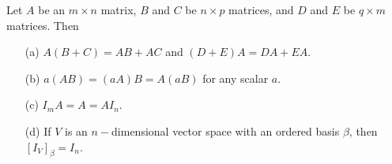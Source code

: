 \begin{theorem}\label{prop of matrices}
    Let \( A  \) be an \( m \times n  \) matrix, \( B  \) and \(  C  \) be \( n \times p  \) matrices, and \( D  \) and \( E  \) be \( q \times  m  \) matrices. Then
    \begin{enumerate}
        \item[(a)] \( A(B+C) = AB + AC  \) and \( (D+E) A = DA + EA  \).
        \item[(b)] \( a(AB) = (aA)B  = A(aB)\) for any scalar \( a  \).
        \item[(c)] \( {I}_{m} A = A = A {I}_{n} \).
        \item[(d)] If \( V  \) is an \( n- \)dimensional vector space with an ordered basis \( \beta  \), then \( [{I}_{V}]_{\beta}^{}  = {I}_{n} \).
    \end{enumerate}
\end{theorem}
